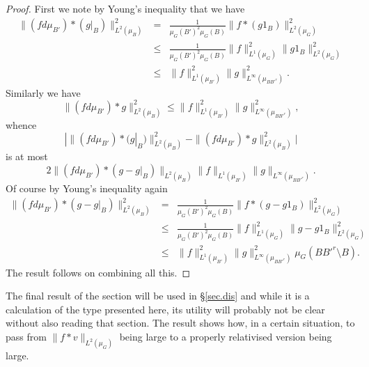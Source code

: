 \documentclass[12pt]{amsart}
\numberwithin{equation}{section}
\theoremstyle{plain}
\theoremstyle{definition}
\renewcommand{\leq}{\leqslant}
\begin{document}
\begin{proof}
First we note by Young's inequality that we have
\begin{eqnarray*}
\|(fd\mu_{B'}) \ast (g|_B)\|_{L^2(\mu_B)}^2 & =& \frac{1}{\mu_G(B')^2\mu_G(B)}\|f \ast (g1_B)\|_{L^2(\mu_G)}^2\\ & \leq &  \frac{1}{\mu_G(B')^2\mu_G(B)}\|f\|_{L^1(\mu_G)}^2\|g1_B\|_{L^2(\mu_G)}^2\\ & \leq & 
\|f\|_{L^1(\mu_{B'})}^2\|g\|_{L^\infty(\mu_{BB'^r})}^2.
\end{eqnarray*}
Similarly we have
\begin{equation*}
\|(fd\mu_{B'}) \ast g\|_{L^2(\mu_B)}^2 \leq
\|f\|_{L^1(\mu_{B'})}^2\|g\|_{L^\infty(\mu_{BB'^r})}^2,
\end{equation*}
whence
\begin{equation*}
|\|(fd\mu_{B'}) \ast (g|_B)\|_{L^2(\mu_B)}^2 - \|(fd\mu_{B'}) \ast g\|_{L^2(\mu_B)}^2 | 
\end{equation*}
is at most
\begin{equation*}
2\|(fd\mu_{B'}) \ast (g - g|_B)\|_{L^2(\mu_B)}\|f\|_{L^1(\mu_{B'})}\|g\|_{L^\infty(\mu_{BB'^r})}.
\end{equation*}
Of course by Young's inequality again
\begin{eqnarray*}
\|(fd\mu_{B'}) \ast (g - g|_B)\|_{L^2(\mu_B)}^2 & =& \frac{1}{\mu_G(B')^2\mu_G(B)}\|f \ast (g-g1_B)\|_{L^2(\mu_G)}^2\\ & \leq &  \frac{1}{\mu_G(B')^2\mu_G(B)}\|f\|_{L^1(\mu_G)}^2\|g-g1_B\|_{L^2(\mu_G)}^2\\ & \leq & 
\|f\|_{L^1(\mu_{B'})}^2\|g\|_{L^\infty(\mu_{BB'^r})}^2\mu_G(BB'^r\setminus B).
\end{eqnarray*}
The result follows on combining all this.
\end{proof}
 The final result of the section will be used in \S\ref{sec.dis} and while it is a calculation of the type presented here, its utility will probably not be clear without also reading that section.  The result shows how, in a certain situation, to pass from $\|f \ast v\|_{L^2(\mu_G)}$ being large to a properly relativised version being large. 
\end{document}
